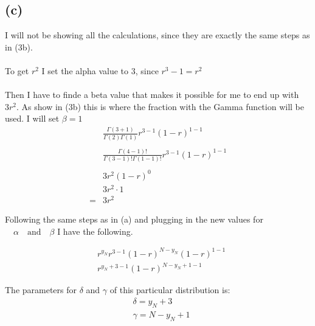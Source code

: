 \subsection{(c)}
I will not be showing all the calculations, since they are exactly the same steps as in (3b).
\\
\\
To get $r^2$ I set the alpha value to 3, since $r^3-1 = r^2$ \\
\\
Then I have to finde a beta value that makes it possible for me to end up with $3r^2$. As show in (3b) this
is where the fraction with the Gamma function will be used.
I will set $\beta = 1$ 
\begin{align*}
    & \frac{\Gamma (3 + 1)}{\Gamma(2)\Gamma(1)} r^{3 - 1}(1 - r)^{1 - 1} \\
    & \\
    & \frac{\Gamma (4 - 1)!}{\Gamma(3 - 1)!\Gamma(1 - 1)!} r^{3 - 1}(1 - r)^{1 - 1} \\
    & \\
    & 3r^{2}(1 - r)^{0} \\
    & 3r^{2} \cdot 1 \\
    = & 3r^{2}
\end{align*}

Following the same steps as in (a) and plugging in the new values for $\quad \alpha \quad \text{and} \quad \beta$
I have the following.

\begin{align*}
    & r^{y_N} r^{3 - 1} (1-r)^{N - y_N} (1 - r)^{1 - 1} \\
    & r^{y_N + 3 - 1} (1 - r)^{N - y_N + 1 - 1} 
\end{align*}

The parameters for $\delta$ and $\gamma$ of this particular distribution is:
\begin{align*}
    & \delta = y_N + 3 \\
    & \gamma = N - y_N + 1 \\
\end{align*}